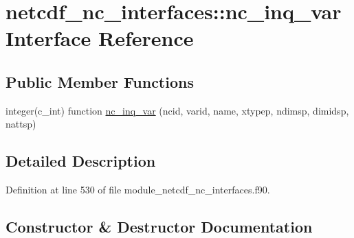 \hypertarget{interfacenetcdf__nc__interfaces_1_1nc__inq__var}{}\section{netcdf\+\_\+nc\+\_\+interfaces\+:\+:nc\+\_\+inq\+\_\+var Interface Reference}
\label{interfacenetcdf__nc__interfaces_1_1nc__inq__var}
\subsection*{Public Member Functions}
\begin{DoxyCompactItemize}
\item 
integer(c\+\_\+int) function \hyperlink{interfacenetcdf__nc__interfaces_1_1nc__inq__var_adf5e7d6767edf3c1f35668d26e872e24}{nc\+\_\+inq\+\_\+var} (ncid, varid, name, xtypep, ndimsp, dimidsp, nattsp)
\end{DoxyCompactItemize}


\subsection{Detailed Description}


Definition at line 530 of file module\+\_\+netcdf\+\_\+nc\+\_\+interfaces.\+f90.



\subsection{Constructor \& Destructor Documentation}
\mbox{\label{interfacenetcdf__nc__interfaces_1_1nc__inq__var_adf5e7d6767edf3c1f35668d26e872e24}} 
